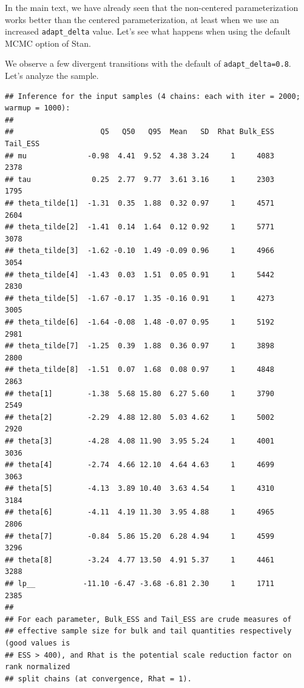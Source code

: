 \documentclass[american,]{article}
\begin{document}
In the main text, we have already seen that the non-centered
parameterization works better than the centered parameterization, at
least when we use an increased \texttt{adapt\_delta} value. Let's see
what happens when using the default MCMC option of Stan.

We observe a few divergent transitions with the default of
\texttt{adapt\_delta=0.8}. Let's analyze the sample.

\begin{verbatim}
## Inference for the input samples (4 chains: each with iter = 2000; warmup = 1000):
## 
##                    Q5   Q50   Q95  Mean   SD  Rhat Bulk_ESS Tail_ESS
## mu              -0.98  4.41  9.52  4.38 3.24     1     4083     2378
## tau              0.25  2.77  9.77  3.61 3.16     1     2303     1795
## theta_tilde[1]  -1.31  0.35  1.88  0.32 0.97     1     4571     2604
## theta_tilde[2]  -1.41  0.14  1.64  0.12 0.92     1     5771     3078
## theta_tilde[3]  -1.62 -0.10  1.49 -0.09 0.96     1     4966     3054
## theta_tilde[4]  -1.43  0.03  1.51  0.05 0.91     1     5442     2830
## theta_tilde[5]  -1.67 -0.17  1.35 -0.16 0.91     1     4273     3005
## theta_tilde[6]  -1.64 -0.08  1.48 -0.07 0.95     1     5192     2981
## theta_tilde[7]  -1.25  0.39  1.88  0.36 0.97     1     3898     2800
## theta_tilde[8]  -1.51  0.07  1.68  0.08 0.97     1     4848     2863
## theta[1]        -1.38  5.68 15.80  6.27 5.60     1     3790     2549
## theta[2]        -2.29  4.88 12.80  5.03 4.62     1     5002     2920
## theta[3]        -4.28  4.08 11.90  3.95 5.24     1     4001     3036
## theta[4]        -2.74  4.66 12.10  4.64 4.63     1     4699     3063
## theta[5]        -4.13  3.89 10.40  3.63 4.54     1     4310     3184
## theta[6]        -4.11  4.19 11.30  3.95 4.88     1     4965     2806
## theta[7]        -0.84  5.86 15.20  6.28 4.94     1     4599     3296
## theta[8]        -3.24  4.77 13.50  4.91 5.37     1     4461     3288
## lp__           -11.10 -6.47 -3.68 -6.81 2.30     1     1711     2385
## 
## For each parameter, Bulk_ESS and Tail_ESS are crude measures of 
## effective sample size for bulk and tail quantities respectively (good values is 
## ESS > 400), and Rhat is the potential scale reduction factor on rank normalized
## split chains (at convergence, Rhat = 1).
\end{verbatim}
\end{document}
